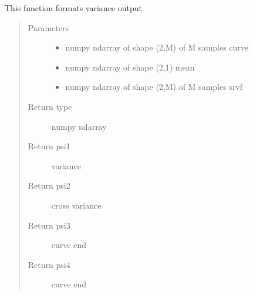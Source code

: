 \documentclass[letterpaper,10pt,english]{sphinxmanual}
\begin{document}
\begin{fulllineitems}
\label{\detokenize{curve_functions:curve_functions.psi}}
This function formats variance output
\begin{quote}\begin{description}
\item[{Parameters}] \leavevmode\begin{itemize}
\item {} 
 \textendash{} numpy ndarray of shape (2,M) of M samples curve

\item {} 
 \textendash{} numpy ndarray of shape (2,1) mean

\item {} 
 \textendash{} numpy ndarray of shape (2,M) of M samples srvf

\end{itemize}

\item[{Return type}] \leavevmode
numpy ndarray

\item[{Return psi1}] \leavevmode
variance

\item[{Return psi2}] \leavevmode
cross variance

\item[{Return psi3}] \leavevmode
curve end

\item[{Return psi4}] \leavevmode
curve end

\end{description}\end{quote}

\end{fulllineitems}

\end{document}
